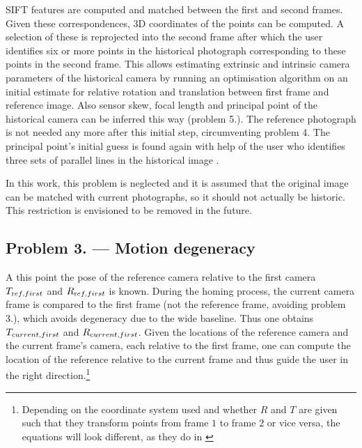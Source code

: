 SIFT features are computed and matched between the first and second frames.
Given these correspondences, 3D coordinates of the points can be computed. A
selection of these is reprojected into the second frame after which the user
identifies six or more points in the historical photograph corresponding to
these points in the second frame. This allows estimating extrinsic and intrinsic
camera parameters of the historical camera by running an optimisation algorithm
on an initial estimate for relative rotation and translation between first frame
and reference image. Also sensor skew, focal length and principal point of the
historical camera can be inferred this way (problem 5.).  The reference
photograph is not needed any more after this initial step, circumventing problem
4.  The principal point's initial guess is found again with help of the user who
identifies three sets of parallel lines in the historical image
\citep[see][chapter 8.8]{h&z2004}.

In this work, this problem is neglected and it is assumed that the original
image can be matched with current photographs, so it should not actually be
historic. This restriction is envisioned to be removed in the future.

\subsection*{Problem 3. --- Motion degeneracy}

A this point the pose of the reference camera relative to the first
camera $T_{\text ref,first}$ and $R_{\text ref,first}$ is known. During the homing
process, the current camera frame is compared to the first frame (not the
reference frame, avoiding problem 3.), which avoids degeneracy due to the wide
baseline. Thus one obtains $T_{\text current,first}$ and $R_{\text current,first}$.
Given the locations of the reference camera and the current frame's camera, each
relative to the first frame, one can compute the location of the reference
relative to the current frame and thus guide the user in the right
direction.\footnote{Depending on the coordinate system used and whether $R$ and
   $T$ are given such that they transform points from frame $1$ to frame $2$ or vice
versa, the equations will look different, as they do in \citep{bae2010}}


